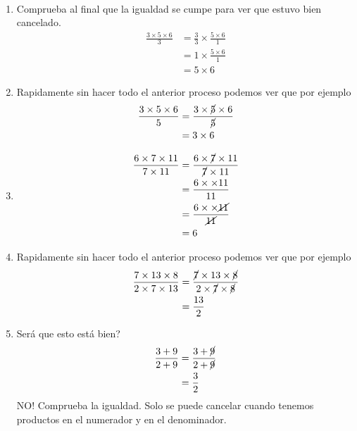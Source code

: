 \begin{ejemplo}{\ \\}
		\begin{enumerate}[label=\Alph*)]
			\item Comprueba al final que la igualdad se cumpe para ver que estuvo bien cancelado.
				\begin{align*}
					\frac{3\times 5\times 6}{3} &=\frac{3}{3}\times \frac{5\times 6}{1}\\
																	&= 1\times  \frac{5\times 6}{1}\\
																	&= 5\times 6
				\end{align*}
				
			\item Rapidamente sin hacer todo el anterior proceso podemos ver que por ejemplo
				\begin{align*}
				\frac{3\times 5\times 6}{5} &= 	\frac{3\times \cancel{5}\times 6}{\cancel{5}}\\
															&= 3\times 6
				\end{align*}
				
			\item 
				\begin{align*}
				\frac{6\times 7\times 11}{7\times 11} &= \frac{6\times \cancel{7}\times 11}{\cancel{7}\times 11} \\
				&= \frac{6\times \times 11}{ 11} \\
				&= \frac{6\times \times \cancel{11}}{\cancel{11}} \\
				&= 6
				\end{align*}
			
			\item Rapidamente sin hacer todo el anterior proceso podemos ver que por ejemplo
				\begin{align*}
				\frac{7\times 13\times 8}{2\times 7\times 13} &= 	\frac{\cancel{7}\times 13\times \cancel{8}}{2\times \cancel{7}\times \cancel{8}} \\
				&= \frac{13}{2}
				\end{align*}
			
			\item Será que esto está bien?
					\begin{align*}
						\frac{3+9}{2+9}&=\frac{3+\cancel{9}}{2+\cancel{9}}\\
						&= \frac{3}{2}
					\end{align*}
					\color{red} NO! \color{black} Comprueba la igualdad. Solo se puede cancelar cuando tenemos productos en el numerador y en el denominador.
          	

\end{enumerate}
\end{ejemplo}
